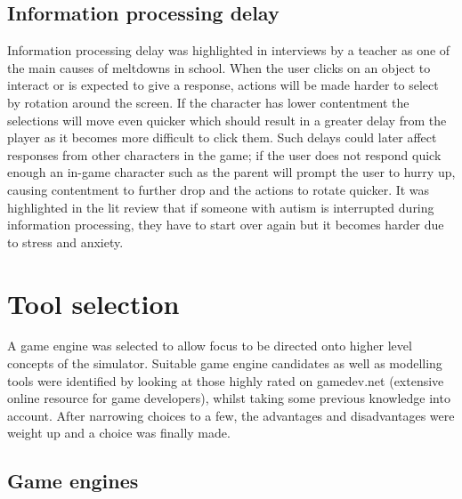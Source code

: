 \documentclass[11pt]{report}
\begin{document}
\subsection{Information processing delay}
Information processing delay was highlighted in interviews by a teacher as one of the main causes of meltdowns in school. When the user clicks on an object to interact or is expected to give a response, actions will be made harder to select by rotation around the screen. If the character has lower contentment the selections will move even quicker which should result in a greater delay from the player as it becomes more difficult to click them. Such delays could later affect responses from other characters in the game; if the user does not respond quick enough an in-game character such as the parent will prompt the user to hurry up, causing contentment to further drop and the actions to rotate quicker. It was highlighted in the lit review that if someone with autism is interrupted during information processing, they have to start over again but it becomes harder due to stress and anxiety. 

\section{Tool selection}
A game engine was selected to allow focus to be directed onto higher level concepts of the simulator. Suitable game engine candidates as well as modelling tools were identified by looking at those highly rated on gamedev.net (extensive online resource for game developers), whilst taking some previous knowledge into account. After narrowing choices to a few, the advantages and disadvantages were weight up and a choice was finally made. 

\subsection{Game engines}
\end{document}
